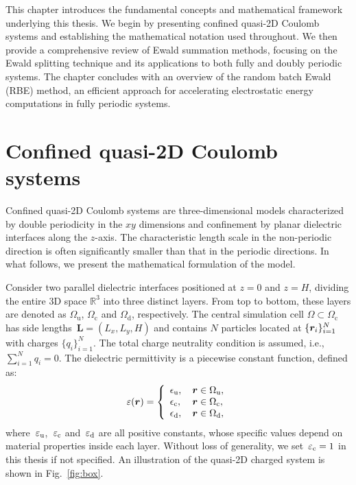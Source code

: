 This chapter introduces the fundamental concepts and mathematical framework underlying this thesis.
We begin by presenting confined quasi-2D Coulomb systems and establishing the mathematical notation used throughout.
We then provide a comprehensive review of Ewald summation methods, focusing on the Ewald splitting technique and its applications to both fully and doubly periodic systems.
The chapter concludes with an overview of the random batch Ewald (RBE) method, an efficient approach for accelerating electrostatic energy computations in fully periodic systems.

\section{Confined quasi-2D Coulomb systems}

Confined quasi-2D Coulomb systems are three-dimensional models characterized by double periodicity in the $xy$ dimensions and confinement by planar dielectric interfaces along the $z$-axis.
The characteristic length scale in the non-periodic direction is often significantly smaller than that in the periodic directions. 
In what follows, we present the mathematical formulation of the model.

Consider two parallel dielectric interfaces positioned at $z=0$ and $z=H$, dividing the entire 3D space $\mathbb{R}^3$ into three distinct layers. 
From top to bottom, these layers are denoted as $\Omega_{\text{u}}$, $\Omega_{\text{c}}$ and $\Omega_{\text{d}}$, respectively. 
The central simulation cell $\Omega\subset\Omega_{\text{c}}$ has side lengths~$\bm{L}=(L_x, L_y, H)$ and contains $N$ particles located at $\{\boldsymbol{r}_i\}_{i=1}^{N}$ with charges $\{q_i\}_{i=1}^{N}$. 
The total charge neutrality condition is assumed, i.e., $\sum_{i=1}^{N}q_i=0$. The dielectric permittivity is a piecewise constant function, defined as:
\begin{equation}\label{eq:sandwich}
    \varepsilon(\boldsymbol{r})=\left\{
        \begin{array}{ll}
        \epsilon_{\mathrm{u}}, &\, {\boldsymbol{r} \in \Omega_{\mathrm{u}}},\\
        \epsilon_{\mathrm{c}}, &\, {\boldsymbol{r} \in \Omega_{\mathrm{c}}},\\
        \epsilon_{\mathrm{d}}, & \,{\boldsymbol{r} \in \Omega_{\mathrm{d}}},
    \end{array} \right.
\end{equation}
where~$\varepsilon_{\text{u}}$,~$\varepsilon_{\text{c}}$ and~$\varepsilon_{\text{d}}$ are all positive constants, whose specific values depend on material properties inside each layer. 
Without loss of generality, we set~$\varepsilon_{\text{c}} = 1$ in this thesis if not specified.
An illustration of the quasi-2D charged system is shown in Fig.~\ref{fig:box}.

